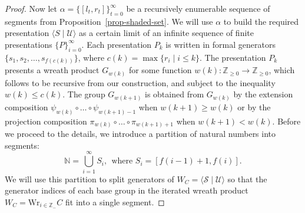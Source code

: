 \documentclass[12pt,a4paper]{amsart}
\begin{document}
\begin{proof}



\smallskip

Now let $\alpha=\{[l_t,r_t]\}_{t=0}^\infty$ be a recursively enumerable sequence of segments from Proposition~\ref{prop-shaded-set}. We will use $\alpha$ to build the required presentation $\langle S \mid \mathcal U \rangle$ as a certain limit
of an infinite sequence of finite presentations $\{P\}_{i=0}^{\infty}$. Each presentation $P_k$ is written in formal generators $\{s_1,s_2,\ldots,s_{f(c(k))}\}$, where $c(k)=\max\{r_i \mid i\leq k\}.$ The presentation $P_k$ presents a wreath product $G_{w(k)}$ for some function $w(k): \mathbb Z_{\geq 0} \to \mathbb Z_{\geq 0}$, which follows to be recursive from our construction, and subject to the inequality $w(k)\leq c(k)$. The group $G_{w(k+1)}$ is obtained from $G_{w(k)}$ by the extension composition $\psi_{w(k)}\circ\ldots\circ\psi_{w(k+1)-1}$ when $w(k+1)\geq w(k)$ or by the projection composition $\pi_{w(k)}\circ\ldots\circ\pi_{w(k+1)+1}$ when $w(k+1)<w(k)$. Before we proceed to the details, we introduce a partition of natural numbers into segments: 
\[
\mathbb N = \bigcup_{i=1}^{\infty} S_i, \ \ \text{where } S_i=[f(i-1)+1,f(i)].
\]
We will use this partition to split generators of $W_C=\langle \mathcal S \mid \mathcal U \rangle$ so that the generator indices of each base group in the iterated wreath product $W_C=\text{Wr}_{i\in \mathbb Z_-}C$ fit into a single segment.


\end{proof}
\end{document}
